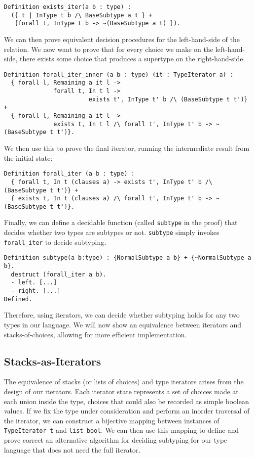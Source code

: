 \documentclass[a4paper,UKenglish]{lipics-v2018}
\begin{document}
\begin{verbatim}
Definition exists_iter(a b : type) : 
  ({ t | InType t b /\ BaseSubtype a t } +
   {forall t, InType t b -> ~(BaseSubtype a t) }).
\end{verbatim}

We can then prove equivalent decision procedures for the left-hand-side of the
relation. We now want to prove that for every choice we make on the left-hand-side,
there exists some choice that produces a supertype on the right-hand-side. 

\begin{verbatim}
Definition forall_iter_inner (a b : type) (it : TypeIterator a) :
  { forall l, Remaining a it l ->
              forall t, In t l ->
                        exists t', InType t' b /\ (BaseSubtype t t')} +
  { forall l, Remaining a it l ->
              exists t, In t l /\ forall t', InType t' b -> ~ (BaseSubtype t t')}.
\end{verbatim}

We then use this to prove the final iterator, running the intermediate result from
the initial state:

\begin{verbatim}
Definition forall_iter (a b : type) :
  { forall t, In t (clauses a) -> exists t', InType t' b /\ (BaseSubtype t t')} +
  { exists t, In t (clauses a) /\ forall t', InType t' b -> ~ (BaseSubtype t t')}.
\end{verbatim}

Finally, we can define a decidable function (called \verb|subtype| in the proof)
that decides whether two types are subtypes or not. \verb|subtype| simply invokes
\verb|forall_iter| to decide subtyping.

\begin{verbatim}
Definition subtype(a b:type) : {NormalSubtype a b} + {~NormalSubtype a b}.
  destruct (forall_iter a b).
  - left. [...]
  - right. [...]
Defined.
\end{verbatim}

Therefore, using iterators, we can decide whether subtyping holds for any two types
in our language. We will now show an equivalence between iterators and stacks-of-choices,
allowing for more efficient implementation.

\subsection{Stacks-as-Iterators}

The equivalence of stacks (or lists of choices) and type iterators arises from
the design of our iterators. Each iterator state represents a set of choices
made at each  union inside the type, choices that could also be recorded as
simple boolean values. If we fix the type under consideration and perform an
inorder traversal of the iterator, we can construct a bijective mapping
between instances of \verb|TypeIterator t| and  \verb|list bool|. We can then
use this mapping to define and prove correct an alternative algorithm for
deciding subtyping for our type language that does not need the full iterator.
\end{document}
